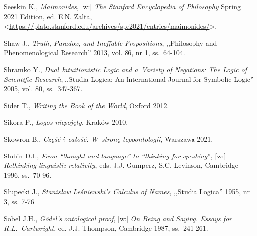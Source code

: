 \begin{thebibliography}{100}
Seeskin K., \textit{Maimonides}, [w:] \textit{The Stanford Encyclopedia of Philosophy}
Spring 2021 Edition, ed. E.N. Zalta, <\url{https://plato.stanford.edu/archives/spr2021/entries/maimonides/}>.


Shaw J., \textit{Truth, Paradox, and Ineffable Propositions}, ,,Philosophy and Phenomenological Research'' 2013, vol. 86, nr 1, ss.~64-104.

Shramko Y., \textit{Dual Intuitionistic Logic and a~Variety of Negations: The Logic of Scientific Research}, ,,Studia Logica: An International Journal for Symbolic Logic'' 2005, vol. 80, ss.~347-367.

Sider T., \textit{Writing the Book of the World}, Oxford 2012.

Sikora P., \textit{Logos niepojęty}, Kraków 2010.


Skowron B., \textit{Część i~całość. W~stronę topoontologii}, Warszawa 2021.

Slobin D.I., \textit{From ``thought and language'' to ``thinking for speaking}'', [w:] \textit{Rethinking linguistic relativity},
eds. J.J. Gumperz, S.C. Levinson, Cambridge 1996, ss.~70-96.

Słupecki J., \textit{Stanisław Leśniewski’s Calculus of Names}, ,,Studia Logica'' 1955, nr 3, ss. 7-76


Sobel J.H., \textit{Gödel's ontological proof}, [w:] \textit{On Being and Saying. Essays for R.L.~Cartwright}, ed. J.J. Thompson, Cambridge 1987, ss.~241-261.


\end{thebibliography}
